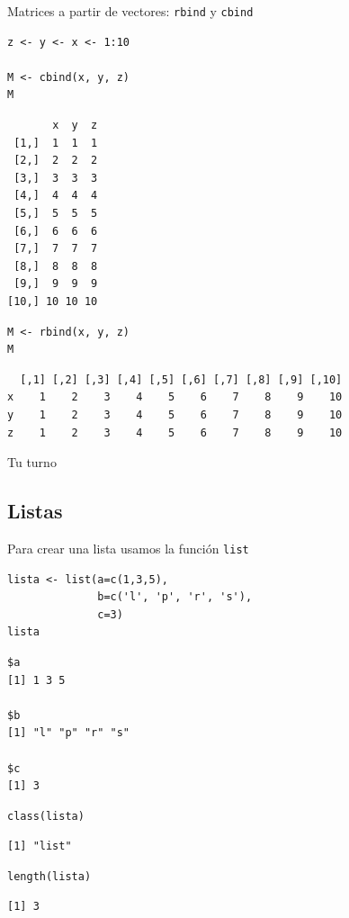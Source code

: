 \documentclass[xcolor={usenames,svgnames,dvipsnames}]{beamer}
\begin{document}
\begin{frame}[fragile,label=sec-2-2-2]{Matrices a partir de vectores: \texttt{rbind} y \texttt{cbind}}
 \lstset{language=R,label= ,caption= ,numbers=none}
\begin{lstlisting}
z <- y <- x <- 1:10

M <- cbind(x, y, z)
M
\end{lstlisting}

\begin{verbatim}
       x  y  z
 [1,]  1  1  1
 [2,]  2  2  2
 [3,]  3  3  3
 [4,]  4  4  4
 [5,]  5  5  5
 [6,]  6  6  6
 [7,]  7  7  7
 [8,]  8  8  8
 [9,]  9  9  9
[10,] 10 10 10
\end{verbatim}

\lstset{language=R,label= ,caption= ,numbers=none}
\begin{lstlisting}
M <- rbind(x, y, z)
M
\end{lstlisting}

\begin{verbatim}
  [,1] [,2] [,3] [,4] [,5] [,6] [,7] [,8] [,9] [,10]
x    1    2    3    4    5    6    7    8    9    10
y    1    2    3    4    5    6    7    8    9    10
z    1    2    3    4    5    6    7    8    9    10
\end{verbatim}
\end{frame}


\begin{frame}[label=sec-2-2-3]{Tu turno}
\end{frame}
\subsection{Listas}
\label{sec-2-3}
\begin{frame}[fragile,label=sec-2-3-1]{Para crear una lista usamos la función \texttt{list}}
 \lstset{language=R,label= ,caption= ,numbers=none}
\begin{lstlisting}
lista <- list(a=c(1,3,5),
              b=c('l', 'p', 'r', 's'),
              c=3)
lista
\end{lstlisting}

\begin{verbatim}
$a
[1] 1 3 5

$b
[1] "l" "p" "r" "s"

$c
[1] 3
\end{verbatim}

\lstset{language=R,label= ,caption= ,numbers=none}
\begin{lstlisting}
class(lista)
\end{lstlisting}

\begin{verbatim}
[1] "list"
\end{verbatim}

\lstset{language=R,label= ,caption= ,numbers=none}
\begin{lstlisting}
length(lista)
\end{lstlisting}

\begin{verbatim}
[1] 3
\end{verbatim}
\end{frame}
\end{document}
